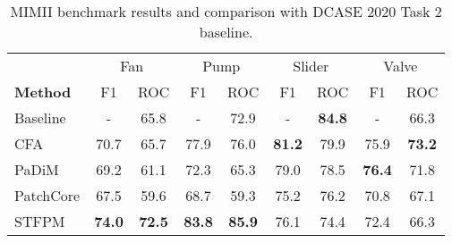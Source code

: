 \begin{table}[htb]
\caption{MIMII benchmark results and comparison with DCASE 2020 Task 2 baseline.}
\label{tab:mimii_bench}
\centering
\begin{tabular}{lcccccccc}
\toprule
& \multicolumn{2}{c}{Fan}          & \multicolumn{2}{c}{Pump}         & \multicolumn{2}{c}{Slider}                & \multicolumn{2}{c}{Valve} \\
\textbf{Method} & F1   & \multicolumn{1}{c|}{ROC}  & F1   & \multicolumn{1}{c|}{ROC}  & F1   & \multicolumn{1}{c|}{ROC}           & F1               & ROC    \\ \midrule
Baseline        & -    & \multicolumn{1}{c|}{65.8} & -    & \multicolumn{1}{c|}{72.9} & -    & \multicolumn{1}{c|}{\textbf{84.8}} & -                & 66.3   \\
CFA &
  70.7 &
  \multicolumn{1}{c|}{65.7} &
  77.9 &
  \multicolumn{1}{c|}{76.0} &
  \textbf{81.2} &
  \multicolumn{1}{c|}{79.9} &
  75.9 &
  \textbf{73.2} \\
PaDiM           & 69.2 & \multicolumn{1}{c|}{61.1} & 72.3 & \multicolumn{1}{c|}{65.3} & 79.0 & \multicolumn{1}{c|}{78.5}          & \textbf{76.4}    & 71.8   \\
PatchCore       & 67.5 & \multicolumn{1}{c|}{59.6} & 68.7 & \multicolumn{1}{c|}{59.3} & 75.2 & \multicolumn{1}{c|}{76.2}          & 70.8             & 67.1   \\
STFPM &
  \textbf{74.0} &
  \multicolumn{1}{c|}{\textbf{72.5}} &
  \textbf{83.8} &
  \multicolumn{1}{c|}{\textbf{85.9}} &
  76.1 &
  \multicolumn{1}{c|}{74.4} &
  72.4 &
  66.3 \\ \bottomrule
\end{tabular}%
\end{table}
